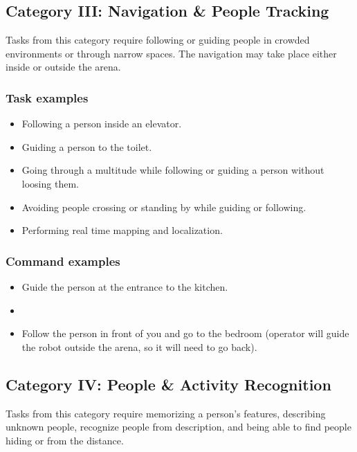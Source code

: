 %
%
\subsection{Category III: Navigation & People Tracking}
\label{sec:eegpsr-category3-explained}
Tasks from this category require following or guiding people in crowded environments or through narrow spaces. The navigation may take place either inside or outside the arena.

\subsubsection{Task examples}
\begin{itemize}
	\item Following a person inside an elevator.
	\item Guiding a person to the toilet.
	\item Going through a multitude while following or guiding a person without loosing them.
	\item Avoiding people crossing or standing by while guiding or following.
	\item Performing real time mapping and localization.
\end{itemize}

\subsubsection{Command examples}
\begin{itemize}
	\item Guide the person at the entrance to the kitchen.
	\item 
	\item Follow the person in front of you and go to the bedroom (operator will guide the robot outside the arena, so it will need to go back). 
\end{itemize}


%
%
\subsection{Category IV: People & Activity Recognition}
\label{sec:eegpsr-category4-explained}
Tasks from this category require memorizing a person's features, describing unknown people, recognize people from description, and being able to find people hiding or from the distance.

